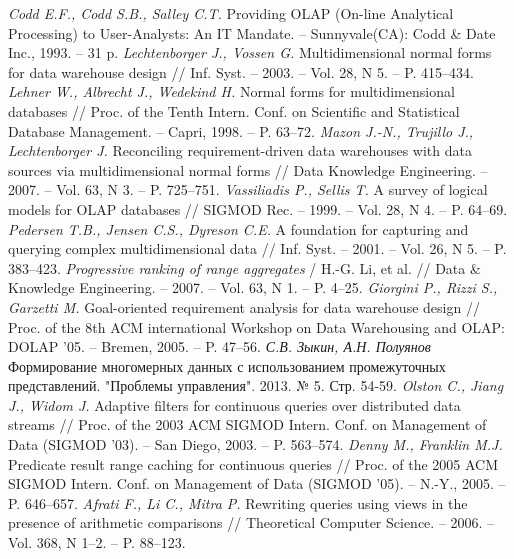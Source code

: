 \begin{thebibliography}{9}
  \textit{Codd E.F., Codd S.B., Salley C.T.}
  Providing OLAP (On-line Analytical Processing) to User-Analysts: An IT
  Mandate. – Sunnyvale(CA): Codd \& Date Inc.,
  1993.
  – 31 p.
  \textit{Lechtenborger J., Vossen G.}
  Multidimensional normal forms for data warehouse design
  // Inf. Syst.
  – 2003.
  – Vol. 28, N 5. – P. 415–434. 
  \textit{Lehner W., Albrecht J., Wedekind H.}
  Normal forms for multidimensional databases
  // Proc. of the Tenth Intern. Conf. on Scientific and Statistical Database
  Management.
  – Capri, 1998.
  – P. 63–72.
  \textit{Mazon J.-N., Trujillo J., Lechtenborger J.}
  Reconciling requirement-driven data warehouses with data sources via
  multidimensional normal forms
  // Data Knowledge Engineering.
  – 2007.
  – Vol. 63, N 3. – P. 725–751.
  \textit{Vassiliadis P., Sellis T.}
  A survey of logical models for OLAP databases
  // SIGMOD Rec.
  – 1999.
  – Vol. 28, N 4. – P. 64–69.
  \textit{Pedersen T.B., Jensen C.S., Dyreson C.E.}
  A foundation for capturing and querying complex multidimensional data
  // Inf. Syst.
  – 2001.
  – Vol. 26, N 5. – P. 383–423.
  \textit{Progressive ranking of range aggregates}
  / H.-G. Li, et al.
  // Data \& Knowledge Engineering.
  – 2007.
  – Vol. 63, N 1. – P. 4–25. 
  \textit{Giorgini P., Rizzi S., Garzetti M.}
  Goal-oriented requirement analysis for data warehouse design
  // Proc. of the 8th ACM international Workshop on Data Warehousing and OLAP: DOLAP '05.
  – Bremen, 2005.
  – P. 47–56.
  \textit{С.В. Зыкин, А.Н. Полуянов}
  Формирование многомерных данных с использованием промежуточных представлений.
  "Проблемы управления".
  2013.
  № 5. Стр. 54-59.
  \textit{Olston C., Jiang J., Widom J.}
  Adaptive filters for continuous queries over distributed data streams
  // Proc. of the 2003 ACM SIGMOD Intern. Conf. on Management of Data (SIGMOD '03).
  – San Diego, 2003.
  – P. 563–574.
  \textit{Denny M., Franklin M.J.}
  Predicate result range caching for continuous queries
  // Proc. of the 2005 ACM SIGMOD Intern. Conf. on Management of Data (SIGMOD '05).
  – N.-Y., 2005.
  – P. 646–657.
  \textit{Afrati F., Li C., Mitra P.}
  Rewriting queries using views in the presence of arithmetic comparisons
  // Theoretical Computer Science.
  – 2006.
 – Vol. 368, N 1–2. – P. 88–123.

\end{thebibliography}
